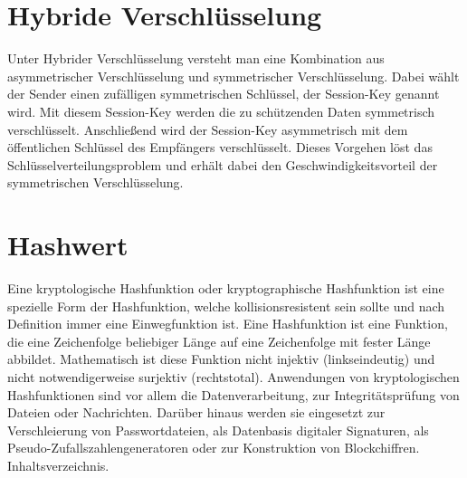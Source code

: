 \section{Hybride Verschlüsselung}
Unter Hybrider Verschlüsselung versteht man eine Kombination aus asymmetrischer Verschlüsselung und symmetrischer Verschlüsselung. Dabei wählt der Sender einen zufälligen symmetrischen Schlüssel, der Session-Key genannt wird. Mit diesem Session-Key werden die zu schützenden Daten symmetrisch verschlüsselt. Anschließend wird der Session-Key asymmetrisch mit dem öffentlichen Schlüssel des Empfängers verschlüsselt. Dieses Vorgehen löst das Schlüsselverteilungsproblem und erhält dabei den Geschwindigkeitsvorteil der symmetrischen Verschlüsselung.

\section{Hashwert}
Eine kryptologische Hashfunktion oder kryptographische Hashfunktion ist eine spezielle Form der Hashfunktion, welche kollisionsresistent sein sollte und nach Definition immer eine Einwegfunktion ist.
Eine Hashfunktion ist eine Funktion, die eine Zeichenfolge beliebiger Länge auf eine Zeichenfolge mit fester Länge abbildet. Mathematisch ist diese Funktion nicht injektiv (linkseindeutig) und nicht notwendigerweise surjektiv (rechtstotal).
Anwendungen von kryptologischen Hashfunktionen sind vor allem die Datenverarbeitung, zur Integritätsprüfung von Dateien oder Nachrichten. Darüber hinaus werden sie eingesetzt zur Verschleierung von Passwortdateien, als Datenbasis digitaler Signaturen, als Pseudo-Zufallszahlengeneratoren oder zur Konstruktion von Blockchiffren.
Inhaltsverzeichnis.


